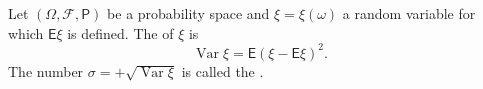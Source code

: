 Let $(\Omega, \mathcal{F}, \mathsf{P})$ be a probability space and $\xi = \xi(\omega)$ a random variable for which $\mathsf{E}\xi$ is defined. The  of $\xi$ is
$$\operatorname{Var}\xi = \mathsf{E}(\xi - \mathsf{E}\xi)^2.$$
The number $\sigma = +\sqrt{\operatorname{Var}\xi}$ is called the .

